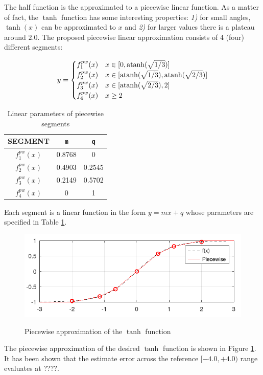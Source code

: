 The half function is the approximated to a piecewise linear function. As a matter of fact, the
$\tanh$ function has some interesting properties: \textit{1)} for small angles, $\tanh(x)$ can be
approximated to $x$ and \textit{2)} for larger values there is a plateau around $2.0$. The proposed
piecewise linear approximation consists of 4 (four) different segments:

\begin{equation}
    y = 
        \begin{cases}
            f_{1}^{pw}(x) & x \in [0,\operatorname{atanh}(\sqrt{1/3})] \\
            f_{2}^{pw}(x) & x \in [\operatorname{atanh}(\sqrt{1/3}),\operatorname{atanh}(\sqrt{2/3})] \\
            f_{3}^{pw}(x) & x \in [\operatorname{atanh}(\sqrt{2/3}),2] \\
            f_{4}^{pw}(x) & x \geq 2
        \end{cases}
\end{equation}

\begin{table}
    \centering
    \label{tab:pwParams}
    \caption{Linear parameters of piecewise segments}
    \begin{tabular}{|c|c|c|} \hline
        \textbf{SEGMENT} & \texttt{m} & \texttt{q} \\ \hline
        $f_{1}^{pw}(x)$ & 0.8768 & 0 \\ \hline
        $f_{2}^{pw}(x)$ & 0.4903 & 0.2545 \\ \hline
        $f_{3}^{pw}(x)$ & 0.2149 & 0.5702 \\ \hline
        $f_{4}^{pw}(x)$ & 0 & 1 \\ \hline
    \end{tabular}
\end{table}
Each segment is a linear function in the form $y = mx + q$ whose parameters are specified in Table
\ref{tab:pwParams}.

\begin{figure}
    \centering
    \includegraphics[width=0.95\columnwidth]{images/tanhPW.png}
    \label{fig:tanhPW}
    \caption{Piecewise approximation of the $\tanh$ function}
\end{figure}
The piecewise approximation of the desired $\tanh$ function is shown in Figure \ref{fig:tanhPW}. It
has been shown that the estimate error across the reference $[-4.0,+4.0)$ range evaluates at ????.


